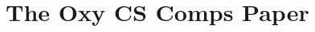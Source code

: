 \documentclass[10pt,twocolumn]{article}
\begin{document}
\begin{comment}

\begin{figure}[]
    \begin{center}
        \texttt{[image: figure.pdf]}
    \end{center}
    \caption{
        Figure caption.
        To get a figure to span two columns, use the {\tt figure*} environment rather than {\tt figure}.
    }
    \label{figure1}
\end{figure}

\begin{quote}
    Lorem ipsum dolor sit amet, consectetur adipiscing elit.
    Mauris pellentesque est nec nunc fringilla, a finibus nisl tempor.
    Sed semper est massa, eget pulvinar neque posuere id.
    Ut mauris tellus. 
\end{quote}

\begin{lstlisting}[language=Python]
def hello():
    print('hello, world!')
\end{lstlisting}

\end{comment}

\begin{comment}
No definition citations, unless the term itself is in dispute
Separate problem background from technical background
    Unclear if games and apps require much technical background
    The general structure of the framework might be better suited for the Architecture Overview section
        Eg. Flask uses decorators to associate functions with URLs
        Eg. Unity has scripts associated with objects and specific triggers, such as walking into an area, pressing a button, etc.
    Maybe a better name is "algorithmic background"?
        Should explore what does and doesn't count
            All ML counts
            App and game frameworks do not
        Framework vs. library?
            I like the idea of [inversion of control](https://martinfowler.com/bliki/InversionOfControl.html), but that may be too abstract for students to understand
        Heuristic: is understanding that system necessary to understand the results?
            Ie. How Flask or Unity works doesn't influence whether the app/game is useful/fun/engaging
            But how (say) linear regression works is highly relevant for why the results match/don't match the actual values
\end{comment}

\section{The Oxy CS Comps Paper}
\end{document}
